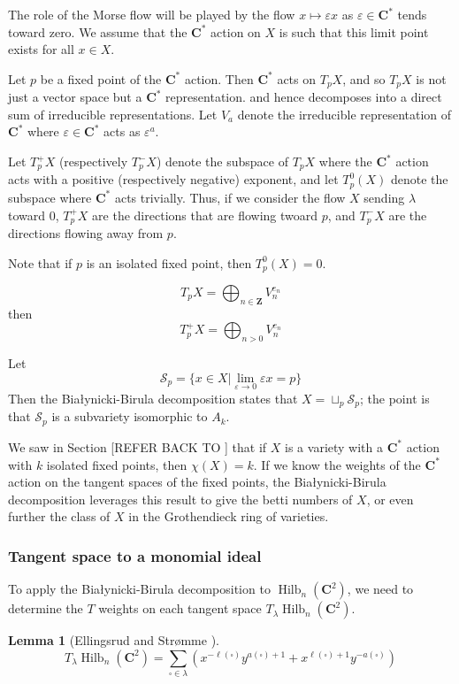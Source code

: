 \documentclass{amsart}[12pt]
\theoremstyle{definition}
\newtheorem{lemma}[dummy]{Lemma}
\newcommand{\Z}{\mathbf{Z}}
\newcommand{\C}{\mathbf{C}}
\DeclareMathOperator{\Hilb}{Hilb}
\begin{document}
The role of the Morse flow will be played by the flow $x\mapsto \varepsilon x$ as $\varepsilon\in\C^*$ tends toward zero.  We assume that the $\C^*$ action on $X$ is such that this limit point exists for all $x\in X$.  

Let $p$ be a fixed point of the $\C^*$ action.  Then $\C^*$ acts on $T_pX$, and so $T_pX$ is not just a vector space but a $\C^*$ representation.   and hence decomposes into a direct sum of irreducible representations.  Let $V_a$ denote the irreducible representation of $\C^*$ where $\varepsilon\in\C^*$ acts as $\varepsilon^a$.  


Let $T_p^+X$ (respectively $T_p^-X$) denote the subspace of $T_pX$ where the $\C^*$ action acts with a positive (respectively negative) exponent, and let $T_p^0(X)$ denote the subspace where $\C^*$ acts trivially.  Thus, if we consider the flow $X$ sending $\lambda$ toward 0, $T_p^+X$ are the directions that are flowing twoard $p$, and $T_p^-X$ are the directions flowing away from $p$.  

Note that if $p$ is an isolated fixed point, then $T_p^0(X)=0$.

$$T_pX=\bigoplus_{n\in\Z} V_n^{e_n}$$
then
$$T_p^+X=\bigoplus_{n>0} V_n^{e_n}$$

Let 
$$\mathcal{S}_p=\{x\in X|\lim_{\varepsilon\to 0} \varepsilon x=p\}$$
Then the Bia\l ynicki-Birula decomposition states that $X=\sqcup_{p}\mathcal{S}_p$; the point is that $\mathcal{S}_p$ is a subvariety isomorphic to $A_k$.





We saw in Section [REFER BACK TO ] that if $X$ is a variety with a $\C^*$ action with $k$ isolated fixed points, then $\chi(X)=k$.  If we know the weights of the $\C^*$ action on the tangent spaces of the fixed points, the Bia\l ynicki-Birula decomposition leverages this result to give the betti numbers of $X$, or even further the class of $X$ in the Grothendieck ring of varieties.

\subsubsection{Tangent space to a monomial ideal}
To apply the Bia\l ynicki-Birula decomposition to $\Hilb_n(\C^2)$, we need to determine the $T$ weights on each tangent space $T_\lambda\Hilb_n(\C^2)$.

\begin{lemma}[Ellingsrud and Str\o mme \cite{ES}] \label{lem:torus-weights}
$$T_\lambda \Hilb_n(\C^2)=\sum_{\square\in\lambda} \left(x^{-\ell(\square)} y^{a(\square)+1}+x^{\ell(\square)+1}y^{-a(\square)}\right)$$
\end{lemma}
\end{document}
